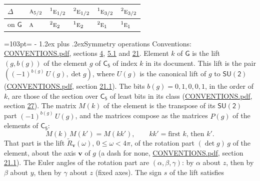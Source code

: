 \documentclass[10pt,a4paper]{article}
\makeatletter
\renewcommand\section{\@startsection{section}{1}{\z@}{-3ex plus -1ex minus -.2ex}%
  {1.2ex plus .2ex}{\normalfont\large\sffamily\bfseries\color{parttitle}}}
\newcommand{\needspace}[1]{\par\penalty-100\begingroup\dimen0=#1\relax\dimen2=\pagegoal
  \advance\dimen2-\pagetotal\ifdim\dimen0>\dimen2\relax\ifdim\dimen2>0pt\vfil\break\fi\fi
  \endgroup}
\numberwithin{equation}{section}
\newcommand{\grp}[1]{\mathsf{#1}}
\newcommand{\irr}[1]{\text{\normalfont\scshape #1}}
\newcommand{\conjpair}[1]{{}^{#1}}
\newcommand{\vv}{\mathbf{v}}
\newcommand{\lift}[1]{\tilde{#1}}
\makeatother
\begin{document}
\begin{center}\begin{tabular}{@{}llllll@{}}\toprule
$\Delta$ & $\irr{a}_{5/2}$ & $\conjpair{1}\irr{e}_{1/2}$ & $\conjpair{2}\irr{e}_{1/2}$ & $\conjpair{1}\irr{e}_{3/2}$ & $\conjpair{2}\irr{e}_{3/2}$\\\midrule
on $\grp{G}$ & $\irr{a}$ & $\conjpair{2}\irr{e}_{2}$ & $\conjpair{1}\irr{e}_{2}$ & $\conjpair{2}\irr{e}_{1}$ & $\conjpair{1}\irr{e}_{1}$\\
\bottomrule\end{tabular}\end{center}
\needspace{103pt}
\section{Symmetry operations}\label{s:elements}
Conventions: \href{../../CONVENTIONS.pdf}{CONVENTIONS.pdf}, sections \href{../../../rotation/CONVENTIONS.pdf\#conv.4}{4}, \href{../../../rotation/CONVENTIONS.pdf\#conv.5.1}{5.1} and \href{../../CONVENTIONS.pdf\#conv.21}{21}.
\leavevmode\label{n:index.element}\label{n:element.g}\label{n:function.section}Element $k$ of $\grp{G}$ is the lift $(g, b(g))$ of the element $g$ of \href{../../../rotation/data/pdf/C5.pdf}{$\grp{C_{5}}$} of index $k$ in its document. This lift is the pair $((-1)^{b(g)}\,U(g), \det g)$, where $U(g)$ is the canonical lift of $g$ to $\grp{SU(2)}$ (\href{../../CONVENTIONS.pdf}{CONVENTIONS.pdf}, section \href{../../CONVENTIONS.pdf\#conv.21.1}{21.1}). The bits $b(g) = 0, 1, 0, 0, 1$, in the order of $k$, are those of the section over $\grp{C_{5}}$ of least bits in its class (\href{../../CONVENTIONS.pdf}{CONVENTIONS.pdf}, section \href{../../CONVENTIONS.pdf\#conv.27}{27}). \label{n:matrix.element.pin}\label{n:matrix.element}The matrix $M(k)$ of the element is the transpose of its $\grp{SU(2)}$ part $(-1)^{b(g)}\,U(g)$, and the matrices compose as the matrices $P(g)$ of the elements of $\grp{C_{5}}$:
\begin{equation}\label{e:mprod}M(k)\,M(k') = M(kk'),\qquad kk' = \text{first } k\text{, then } k'.\end{equation}
\leavevmode\label{n:angle.omega}\label{n:vector.axis}\label{n:vector.pole}That part is the lift $\lift{R}_{\vv}(\omega)$, $0 \le \omega < 4\pi$, of the rotation part $(\det g)\,g$ of the element, about the axis $\vv$ of $g$ (a dash for none, \href{../../CONVENTIONS.pdf}{CONVENTIONS.pdf}, section \href{../../CONVENTIONS.pdf\#conv.21.1}{21.1}). \label{n:angle.euler.alpha}\label{n:angle.euler.beta}\label{n:angle.euler.gamma}\label{n:vector.coordinates}The Euler angles of the rotation part are $(\alpha,\beta,\gamma)$: by $\alpha$ about $z$, then by $\beta$ about $y$, then by $\gamma$ about $z$ (fixed axes). \label{n:local.euler.sign}The sign $s$ of the lift satisfies
\end{document}
